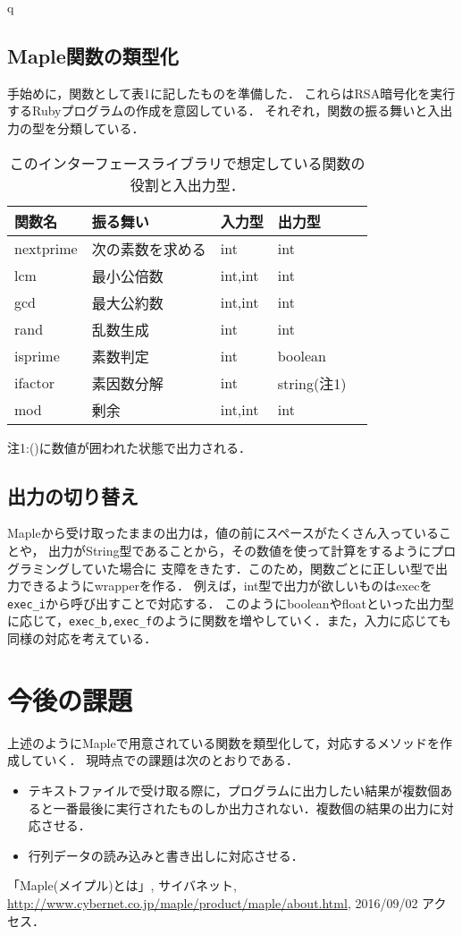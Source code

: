 q\documentclass[10pt,a4j,twocolumn]{jsarticle}
\begin{document}
\subsection{Maple関数の類型化}
手始めに，関数として表1に記したものを準備した．
これらはRSA暗号化を実行するRubyプログラムの作成を意図している．
それぞれ，関数の振る舞いと入出力の型を分類している．
\begin{table}[htbp]\begin{center}
\caption{このインターフェースライブラリで想定している関数の役割と入出力型．}
\begin{tabular}{lllll}
\hline
関数名  &振る舞い  &入力型  &出力型  \\ \hline
nextprime  &次の素数を求める  &int  &int  \\
lcm  &最小公倍数  &int,int  &int  \\
gcd  &最大公約数  &int,int  &int  \\
rand  &乱数生成  &int  &int  \\
isprime  &素数判定  &int  &boolean  \\
ifactor  &素因数分解  &int  &string{\footnotesize (注1)}  \\
mod  &剰余  &int,int  &int  \\
\hline
\end{tabular}
\end{center}
{\footnotesize 注1:()に数値が囲われた状態で出力される．}
\label{default}
\end{table}

\subsection{出力の切り替え}
Mapleから受け取ったままの出力は，値の前にスペースがたくさん入っていることや，
出力がString型であることから，その数値を使って計算をするようにプログラミングしていた場合に
支障をきたす．このため，関数ごとに正しい型で出力できるようにwrapperを作る．
例えば，int型で出力が欲しいものはexecを\verb|exec_i|から呼び出すことで対応する．
このようにbooleanやfloatといった出力型に応じて，\verb|exec_b,exec_f|のように関数を増やしていく．また，入力に応じても同様の対応を考えている．

\section{今後の課題}
上述のようにMapleで用意されている関数を類型化して，対応するメソッドを作成していく．
現時点での課題は次のとおりである．
\begin{itemize}
\item テキストファイルで受け取る際に，プログラムに出力したい結果が複数個あると一番最後に実行されたものしか出力されない．複数個の結果の出力に対応させる．
\item 行列データの読み込みと書き出しに対応させる．
\end{itemize}

\begin{flushleft}
\begin{thebibliography}{9}
「Maple(メイプル)とは」, サイバネット, \url{http://www.cybernet.co.jp/maple/product/maple/about.html}, 2016/09/02 アクセス．
\end{thebibliography}
\end{flushleft}
\end{document}
